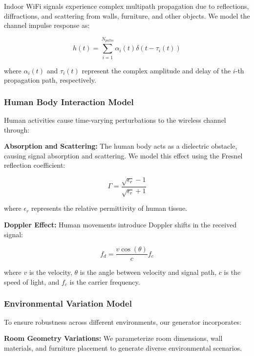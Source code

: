 \documentclass[journal]{IEEEtran}
\begin{document}
Indoor WiFi signals experience complex multipath propagation due to reflections, diffractions, and scattering from walls, furniture, and other objects. We model the channel impulse response as:

\begin{equation}
h(t) = \sum_{i=1}^{N_{paths}} \alpha_i(t) \delta(t - \tau_i(t))
\end{equation}

where $\alpha_i(t)$ and $\tau_i(t)$ represent the complex amplitude and delay of the $i$-th propagation path, respectively.

\subsubsection{Human Body Interaction Model}

Human activities cause time-varying perturbations to the wireless channel through:

\textbf{Absorption and Scattering:} The human body acts as a dielectric obstacle, causing signal absorption and scattering. We model this effect using the Fresnel reflection coefficient:

\begin{equation}
\Gamma = \frac{\sqrt{\epsilon_r} - 1}{\sqrt{\epsilon_r} + 1}
\end{equation}

where $\epsilon_r$ represents the relative permittivity of human tissue.

\textbf{Doppler Effect:} Human movements introduce Doppler shifts in the received signal:

\begin{equation}
f_d = \frac{v \cos(\theta)}{c} f_c
\end{equation}

where $v$ is the velocity, $\theta$ is the angle between velocity and signal path, $c$ is the speed of light, and $f_c$ is the carrier frequency.

\subsubsection{Environmental Variation Model}

To ensure robustness across different environments, our generator incorporates:

\textbf{Room Geometry Variations:} We parameterize room dimensions, wall materials, and furniture placement to generate diverse environmental scenarios.
\end{document}
